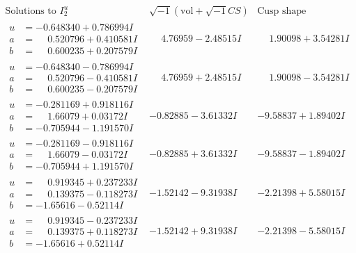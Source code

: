 \documentclass[1p]{elsarticle_modified}
\theoremstyle{definition}
\newcommand{\I}{\sqrt{-1}}
\begin{document}
$$\begin{array}{c|c|c}  
\text{Solutions to }I^u_{2}& \I (\text{vol} + \sqrt{-1}CS) & \text{Cusp shape}\\
 \hline 
\begin{aligned}
u &= -0.648340 + 0.786994 I \\
a &= \phantom{-}0.520796 + 0.410581 I \\
b &= \phantom{-}0.600235 + 0.207579 I\end{aligned}
 & \phantom{-}4.76959 - 2.48515 I & \phantom{-}1.90098 + 3.54281 I \\ \hline\begin{aligned}
u &= -0.648340 - 0.786994 I \\
a &= \phantom{-}0.520796 - 0.410581 I \\
b &= \phantom{-}0.600235 - 0.207579 I\end{aligned}
 & \phantom{-}4.76959 + 2.48515 I & \phantom{-}1.90098 - 3.54281 I \\ \hline\begin{aligned}
u &= -0.281169 + 0.918116 I \\
a &= \phantom{-}1.66079 + 0.03172 I \\
b &= -0.705944 - 1.191570 I\end{aligned}
 & -0.82885 - 3.61332 I & -9.58837 + 1.89402 I \\ \hline\begin{aligned}
u &= -0.281169 - 0.918116 I \\
a &= \phantom{-}1.66079 - 0.03172 I \\
b &= -0.705944 + 1.191570 I\end{aligned}
 & -0.82885 + 3.61332 I & -9.58837 - 1.89402 I \\ \hline\begin{aligned}
u &= \phantom{-}0.919345 + 0.237233 I \\
a &= \phantom{-}0.139375 - 0.118273 I \\
b &= -1.65616 - 0.52114 I\end{aligned}
 & -1.52142 - 9.31938 I & -2.21398 + 5.58015 I \\ \hline\begin{aligned}
u &= \phantom{-}0.919345 - 0.237233 I \\
a &= \phantom{-}0.139375 + 0.118273 I \\
b &= -1.65616 + 0.52114 I\end{aligned}
 & -1.52142 + 9.31938 I & -2.21398 - 5.58015 I \\ \hline\begin{aligned}

\end{aligned}
\end{array}$$
\end{document}
